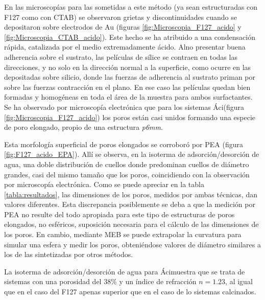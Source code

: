 		 En las microscopías para las \pdm\space sometidas a este método (ya sean estructuradas con F127 como con CTAB) se observaron grietas y discontinuidades cuando se depositaron sobre electrodos de Au (figuras \ref{fig:Microscopia_F127_acido} y \ref{fig:Microscopia_CTAB_acido}). Este hecho se ha atribuido a una condensación rápida, catalizada por el medio extremadamente ácido. Al\space no presentar buena adherencia sobre el sustrato, las películas de sílice se contraen en todas las direcciones, y no solo en la dirección normal a la superficie, como ocurre en las \pdm\space depositadas sobre silicio, donde las fuerzas de adherencia al sustrato priman por sobre las fuerzas contracción en el plano\cite{Sakatani2006,Boissiere2005,Guillemin2010}. En ese caso las películas quedan bien formadas y homogéneas en toda el área de la muestra para ambos surfactantes. Se ha observado por microscopía electrónica que para los sistemas Áci\pdmF\space (figura \ref{fig:Microscopia_F127_acido}) los  poros están casi unidos formando una especie de poro elongado, propio de una estructura \textit{p6mm}\cite{GonzalezSolveyra2017}. 
	
		 Esta morfología superficial de poros elongados se corroboró por PEA (figura \ref{fig:F127_acido_EPA}). Allí se observa, en la isoterma de adsorción/desorción de agua, una doble distribución de cuellos donde predominan cuellos de diámetro grandes, casi del mismo tamaño que los poros, coincidiendo con la observación por microscopía electrónica.
		 Como se puede apreciar en la tabla \ref{tabla:resultados}, las dimensiones de los poros, medidos por ambas técnicas, dan valores diferentes. Esta discrepancia posiblemente se deba a que la medición por PEA no resulte del todo apropiada para este tipo de estructuras de poros elongados, no esféricos, suposición necesaria para el cálculo de las dimensiones de los poros. En cambio, mediante MEB se puede extrapolar la curvatura para simular una esfera y medir los poros, obteniéndose valores de diámetro similares a los de las \pdmF\space sintetizadas por otros métodos.

		 La isoterma de adsorción/desorción de agua para Áci\pdmC\space muestra que se trata de sistemas con una porosidad del 38\% y un índice de refracción $n=1.23$, al igual que en el caso del F127 apenas superior que en el caso de lo sistemas calcinados.
		
